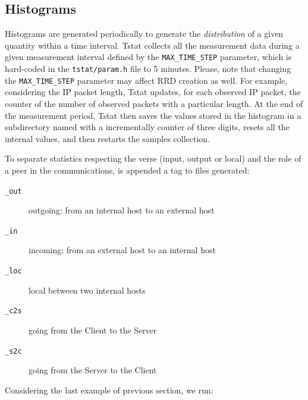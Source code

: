 \documentclass[11pt]{article}
\begin{document}
\subsection{Histograms\label{Histograms}}


Histograms are generated periodically to generate the \textit{distribution} of a 
given quantity within a time interval. Tstat collects all the
measurement data during a given measurement interval defined by the \texttt{MAX\_TIME\_STEP} 
parameter, which is hard-coded in the \texttt{tstat/param.h} file to 5 minutes. Please, note
that changing the \texttt{MAX\_TIME\_STEP} parameter may affect RRD creation as well.
For example, considering the IP packet length, Tstat updates, for
each observed IP packet, the counter of the number of observed packets with a
particular length. At the end of the measurement period, Tstat then saves
the values stored in the histogram in a subdirectory named with a incrementally counter
of three digits, resets all the internal values, and then restarts 
the samples collection.



To separate statistics respecting the verse (input, output or local) and the role of a
peer in the communications, is appended a tag to files generated:

\begin{description}

\item[{\texttt{\_out}}] \mbox{}

outgoing: from an internal host to an external host


\item[{\texttt{\_in}}] \mbox{}

incoming: from an external host to an internal host


\item[{\texttt{\_loc}}] \mbox{}

local between two internal hosts


\item[{\texttt{\_c2s}}] \mbox{}

going from the Client to the Server


\item[{\texttt{\_s2c}}] \mbox{}

going from the Server to the Client

\end{description}


Considering the last example of previous section, we run:
\end{document}
